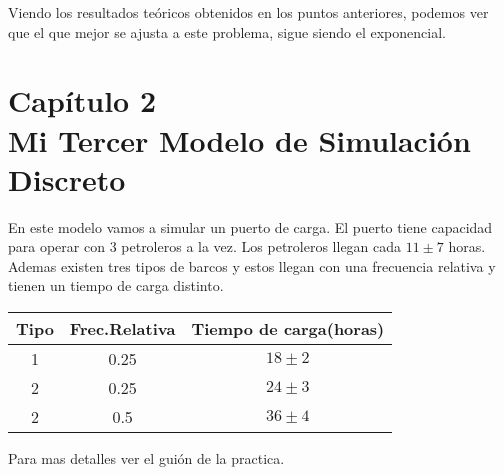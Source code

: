 \documentclass[12pt,a4paper]{article}
\begin{document}
Viendo los resultados teóricos obtenidos en los puntos anteriores, podemos ver que el que mejor se ajusta a este problema, sigue siendo el exponencial.
\section[Capítulo 2: Mi tercer modelo de simulación discreto]{Capítulo 2\\{\large Mi Tercer Modelo de Simulación Discreto}}
En este modelo vamos a simular un puerto de carga. El puerto tiene capacidad para operar con 3 petroleros a la vez. Los petroleros llegan cada $11\pm7$ horas. Ademas existen tres tipos de barcos y estos llegan con una frecuencia relativa  y tienen un tiempo de carga distinto.
\begin{table}[h]
	\centering
	\begin{tabular}{c|cc}\toprule
		Tipo&Frec.Relativa&Tiempo de carga(horas)\\\midrule
		1&0.25&$18\pm2$\\
		2&0.25&$24\pm3$\\
		2&0.5&$36\pm4$\\
	\end{tabular}
\end{table}
Para mas detalles ver el guión de la practica.
\end{document}
